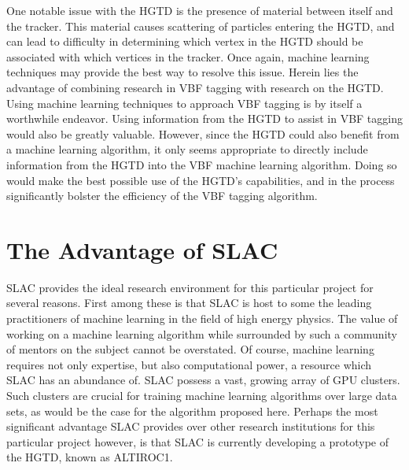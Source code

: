 \documentclass[12pt,letterpaper]{article}
\begin{document}
    One notable issue with the HGTD is the presence of material between itself and the tracker. This material causes scattering of particles entering the HGTD, and can lead to difficulty in determining which vertex in the HGTD should be associated with which vertices in the tracker. Once again, machine learning techniques may provide the best way to resolve this issue. Herein lies the advantage of combining research in VBF tagging with research on the HGTD. Using machine learning techniques to approach VBF tagging is by itself a worthwhile endeavor. Using information from the HGTD to assist in VBF tagging would also be greatly valuable. However, since the HGTD could also benefit from a machine learning algorithm, it only seems appropriate to directly include information from the HGTD into the VBF machine learning algorithm. Doing so would make the best possible use of the HGTD's capabilities, and in the process significantly bolster the efficiency of the VBF tagging algorithm.



\section*{The Advantage of SLAC}
    SLAC provides the ideal research environment for this particular project for several reasons. First among these is that SLAC is host to some the leading practitioners of machine learning in the field of high energy physics. The value of working on a machine learning algorithm while surrounded by such a community of mentors on the subject cannot be overstated. Of course, machine learning requires not only expertise, but also computational power, a resource which SLAC has an abundance of. SLAC possess a vast, growing array of GPU clusters. Such clusters are crucial for training machine learning algorithms over large data sets, as would be the case for the algorithm proposed here. Perhaps the most significant advantage SLAC provides over other research institutions for this particular project however, is that SLAC is currently developing a prototype of the HGTD, known as ALTIROC1.
\end{document}
